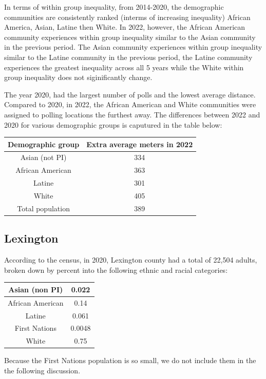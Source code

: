 \documentclass[11pt]{article}
\theoremstyle{remark}
\theoremstyle{definition}
\begin{document}
In terms of within group inequality, from 2014-2020, the demographic communities are consistently ranked (interms of increasing inequality) African America, Asian, Latine then White. In 2022, however, the African American community experiences within group inequality similar to the Asian community in the previous period. The Asian community experiences within group inequality similar to the Latine community in the previous period, the Latine community experiences the greatest inequality across all 5 years while the White within group inequality does not siginificantly change. 

The year 2020, had the largest number of polls and the lowest average distance. Compared to 2020, in 2022, the African American and White communities were assigned to polling locations the furthest away. The differences between 2022 and 2020 for various demographic groups is caputured in the table below:

\begin{tabular}{|c|c|}
	\hline
	Demographic group & Extra average meters in 2022 \\ \hline
	Asian (not PI) &   334 \\ \hline
	African American &   363  \\ \hline
	Latine & 301 \\ \hline
	White &  405\\ \hline
	Total population &  389\\ \hline
\end{tabular}

\subsection{Lexington \label{sec:Lexington distances}}
According to the census, in 2020, Lexington county had a total of 22,504  adults, broken down by percent into the following ethnic and racial categories:

\begin{tabular} {| c | c |} 
	\hline
	Asian (non PI) &  0.022 \\ \hline
	African American & 0.14 \\ \hline
	Latine & 0.061 \\ \hline
	First Nations & 0.0048 \\ \hline
	White  & 0.75 \\ \hline
\end{tabular}

Because the First Nations population is so small, we do not include them in the the following discussion.
\end{document}
